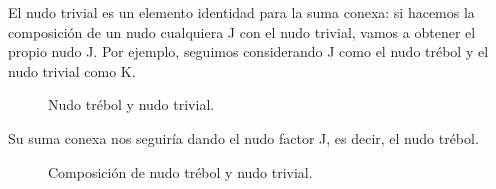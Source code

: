 El nudo trivial es un elemento identidad para la suma conexa: si hacemos la composición de un nudo cualquiera J con el nudo trivial, vamos a obtener el propio nudo J. Por ejemplo, seguimos considerando J como el nudo trébol y el nudo trivial como K. \\
\begin{figure}[h!]
	\centering
	\caption{Nudo trébol y nudo trivial.}
	\label{comp3} 
\end{figure}

Su suma conexa nos seguiría dando el nudo factor J, es decir, el nudo trébol.\\

\begin{figure}[h!]
	\centering
	\caption{Composición de nudo trébol y nudo trivial.}
	\label{comp4} 
\end{figure}

